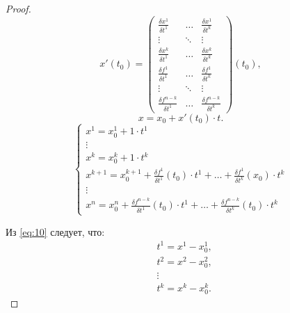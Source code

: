 \begin{proof}
    \[
        x'(t_0) = \left(\begin{matrix}
                \frac{\delta x^1}{\delta t^1}     & \ldots & \frac{\delta x^1}{\delta t^k}     \\
                \vdots                            & \ddots & \vdots                            \\
                \frac{\delta x^k}{\delta t^1}     & \ldots & \frac{\delta x^k}{\delta t^k}     \\
                \frac{\delta f^1}{\delta t^1}     & \ldots & \frac{\delta f^1}{\delta t^k}     \\
                \vdots                            & \ddots & \vdots                            \\
                \frac{\delta f^{n-k}}{\delta t^1} & \ldots & \frac{\delta f^{n-k}}{\delta t^k}
            \end{matrix}\right)(t_0),
    \]
    \[
        x = x_0 + x'(t_0)\cdot t.
    \]
    \begin{equation}\label{eq:10}
        \left\{\begin{array}{l}
            x^1 = x_0^1 + 1 \cdot t^1                                                                                                 \\
            \vdots                                                                                                                    \\
            x^k = x_0^k + 1 \cdot t^k                                                                                                 \\
            x^{k+1} = x_0^{k+1} + \frac{\delta f^1}{\delta t^1}(t_0) \cdot t^1 + \ldots + \frac{\delta f^1}{\delta t^k}(x_0)\cdot t^k \\
            \vdots                                                                                                                    \\
            x^n = x_0^n + \frac{\delta f^{n-k}}{\delta t^1}(t_0)\cdot t^1 + \ldots + \frac{\delta f^{n-k}}{\delta t^k}(t_0)\cdot t^k
        \end{array}\right.
    \end{equation}

    Из \ref{eq:10} следует, что:
    \begin{align*}
         & t^1 = x^1 - x_0^1, \\
         & t^2 = x^2 - x_0^2, \\
         & \vdots             \\
         & t^k = x^k - x_0^k.
    \end{align*}


\end{proof}

